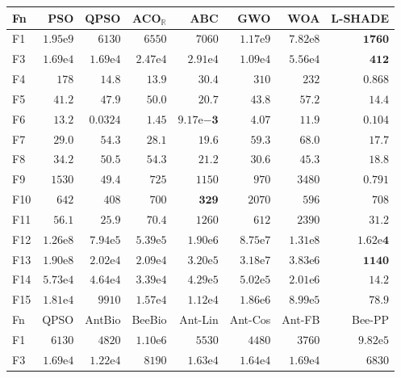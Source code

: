 \begin{tabular}{lrrrrrrr}
\toprule
Fn & PSO & QPSO & ACO$_\mathbb{R}$ & ABC & GWO & WOA & L-SHADE \\
\midrule
F1 & $1.95\mathrm{e}{9}$ & $6130$ & $6550$ & $7060$ & $1.17\mathrm{e}{9}$ & $7.82\mathrm{e}{8}$ & $\mathbf{1760}$ \\
F3 & $1.69\mathrm{e}{4}$ & $1.69\mathrm{e}{4}$ & $2.47\mathrm{e}{4}$ & $2.91\mathrm{e}{4}$ & $1.09\mathrm{e}{4}$ & $5.56\mathrm{e}{4}$ & $\mathbf{412}$ \\
F4 & $178$ & $14.8$ & $13.9$ & $30.4$ & $310$ & $232$ & $\mathbf{0.868}$ \\
F5 & $41.2$ & $47.9$ & $50.0$ & $20.7$ & $43.8$ & $57.2$ & $\mathbf{14.4}$ \\
F6 & $13.2$ & $0.0324$ & $1.45$ & $\mathbf{9.17\mathrm{e}{-3}}$ & $4.07$ & $11.9$ & $0.104$ \\
F7 & $29.0$ & $54.3$ & $28.1$ & $19.6$ & $59.3$ & $68.0$ & $17.7$ \\
F8 & $34.2$ & $50.5$ & $54.3$ & $21.2$ & $30.6$ & $45.3$ & $18.8$ \\
F9 & $1530$ & $49.4$ & $725$ & $1150$ & $970$ & $3480$ & $\mathbf{0.791}$ \\
F10 & $642$ & $408$ & $700$ & $\mathbf{329}$ & $2070$ & $596$ & $708$ \\
F11 & $56.1$ & $\mathbf{25.9}$ & $70.4$ & $1260$ & $612$ & $2390$ & $31.2$ \\
F12 & $1.26\mathrm{e}{8}$ & $7.94\mathrm{e}{5}$ & $5.39\mathrm{e}{5}$ & $1.90\mathrm{e}{6}$ & $8.75\mathrm{e}{7}$ & $1.31\mathrm{e}{8}$ & $\mathbf{1.62\mathrm{e}{4}}$ \\
F13 & $1.90\mathrm{e}{8}$ & $2.02\mathrm{e}{4}$ & $2.09\mathrm{e}{4}$ & $3.20\mathrm{e}{5}$ & $3.18\mathrm{e}{7}$ & $3.83\mathrm{e}{6}$ & $\mathbf{1140}$ \\
F14 & $5.73\mathrm{e}{4}$ & $4.64\mathrm{e}{4}$ & $3.39\mathrm{e}{4}$ & $4.29\mathrm{e}{5}$ & $5.02\mathrm{e}{5}$ & $2.01\mathrm{e}{6}$ & $\mathbf{14.2}$ \\
F15 & $1.81\mathrm{e}{4}$ & $9910$ & $1.57\mathrm{e}{4}$ & $1.12\mathrm{e}{4}$ & $1.86\mathrm{e}{6}$ & $8.99\mathrm{e}{5}$ & $\mathbf{78.9}$ \\
\midrule
Fn & QPSO & AntBio & BeeBio & Ant-Lin & Ant-Cos & Ant-FB & Bee-PP \\
\midrule
F1 & $6130$ & $4820$ & $1.10\mathrm{e}{6}$ & $5530$ & $4480$ & $3760$ & $9.82\mathrm{e}{5}$ \\
F3 & $1.69\mathrm{e}{4}$ & $1.22\mathrm{e}{4}$ & $8190$ & $1.63\mathrm{e}{4}$ & $1.64\mathrm{e}{4}$ & $1.69\mathrm{e}{4}$ & $6830$ \\

\end{tabular}
